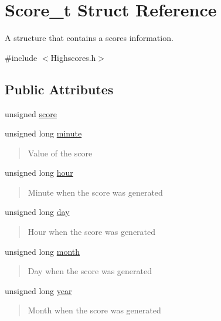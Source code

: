 \hypertarget{struct_score__t}{}\section{Score\+\_\+t Struct Reference}
\label{struct_score__t}


A structure that contains a score\textquotesingle{}s information.  




{\ttfamily \#include $<$Highscores.\+h$>$}

\subsection*{Public Attributes}
\begin{DoxyCompactItemize}
\item 
unsigned \hyperlink{struct_score__t_ad6b186bd04c2536263e3ed3127de805c}{score}
\item 
unsigned long \hyperlink{struct_score__t_a035bb47e5cdd035b8040c0c14c02547c}{minute}
\begin{DoxyCompactList}\small\item\em \begin{quote}
Value of the score \end{quote}
\end{DoxyCompactList}\item 
unsigned long \hyperlink{struct_score__t_a787052856b8f467eae6b2fa0f39dc508}{hour}
\begin{DoxyCompactList}\small\item\em \begin{quote}
Minute when the score was generated \end{quote}
\end{DoxyCompactList}\item 
unsigned long \hyperlink{struct_score__t_a26a15e675c59db516e0a7dbdda35fe66}{day}
\begin{DoxyCompactList}\small\item\em \begin{quote}
Hour when the score was generated \end{quote}
\end{DoxyCompactList}\item 
unsigned long \hyperlink{struct_score__t_a16e3369fa57b8148abfb58748004cf36}{month}
\begin{DoxyCompactList}\small\item\em \begin{quote}
Day when the score was generated \end{quote}
\end{DoxyCompactList}\item 
unsigned long \hyperlink{struct_score__t_a5cbdf9b5075e8f5f8f5fd2032bc459cc}{year}
\begin{DoxyCompactList}\small\item\em \begin{quote}
Month when the score was generated \end{quote}
\end{DoxyCompactList}\end{DoxyCompactItemize}


